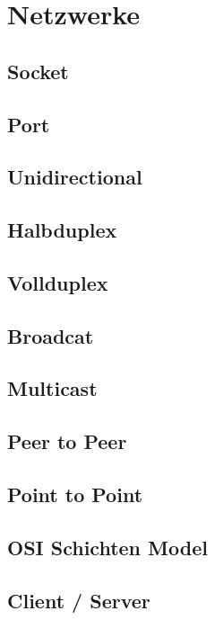\section{Netzwerke}

\subsection{Socket}

\subsection{Port}

\subsection{Unidirectional}

\subsection{Halbduplex}

\subsection{Vollduplex}

\subsection{Broadcat}

\subsection{Multicast}

\subsection{Peer to Peer}

\subsection{Point to Point}

\subsection{OSI Schichten Model}

\subsection{Client / Server}

